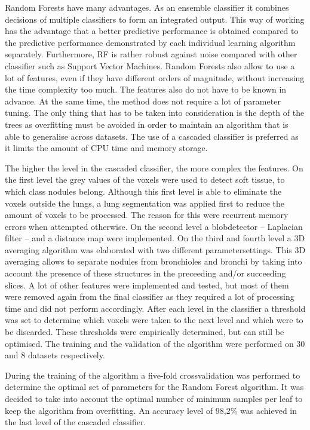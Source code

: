 Random Forests have many advantages. As an ensemble classifier it combines
decisions of multiple classifiers to form an integrated output. This way of
working has the advantage that a better predictive performance is obtained
compared to the predictive performance demonstrated by each individual learning
algorithm separately. Furthermore, RF is rather robust against noise compared
with other classifier such as Support Vector Machines. Random Forests also allow
to use a lot of features, even if they have different orders of magnitude,
without increasing the time complexity too much. The features also do not have
to be known in advance. At the same time, the method does not require a lot of
parameter tuning. The only thing that has to be taken into consideration is the
depth of the trees as overfitting must be avoided in order to maintain an
algorithm that is able to generalise across datasets. The use of a cascaded
classifier is preferred as it limits the amount of CPU time and memory storage.
 
The higher the level in the cascaded classifier, the more complex the features.
On the first level the grey values of the voxels were used to detect soft
tissue, to which class nodules belong. Although this first level is able to
eliminate the voxels outside the lungs, a lung segmentation was applied first to
reduce the amount of voxels to be processed. The reason for this were recurrent
memory errors when attempted otherwise. On the second level a blobdetector --
Laplacian filter -- and a distance map were implemented. On the third and fourth
level a 3D averaging algorithm was elaborated with two different
parametersettings. This 3D averaging allows to separate nodules from bronchioles
and bronchi by taking into account the presence of these structures in the
preceeding and/or succeeding slices. A lot of other features were implemented
and tested, but most of them were removed again from the final classifier as
they required a lot of processing time and did not perform accordingly. After
each level in the classifier a threshold was set to determine which voxels were
taken to the next level and which were to be discarded. These thresholds were
empirically determined, but can still be optimised. The training and the
validation of the algorithm were performed on 30 and 8 datasets respectively.

During the training of the algorithm a five-fold crossvalidation was performed
to determine the optimal set of parameters for the Random Forest algorithm. It
was decided to take into account the optimal number of minimum samples per leaf
to keep the algorithm from overfitting. An accuracy level of 98,2\% was achieved
in the last level of the cascaded classifier.

